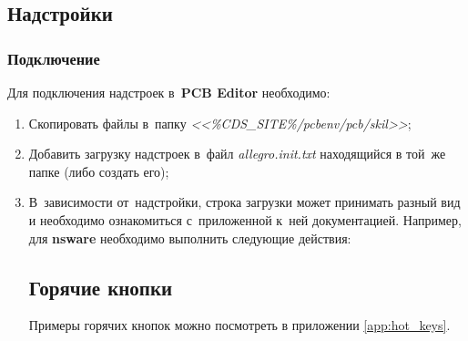 \subsection{Надстройки} \label{ssec:plugin}

\subsubsection{Подключение} \label{sssec:plugin_setup}

Для подключения надстроек в~\textbf{PCB Editor} необходимо:
\begin{enumerate}
	\item Скопировать файлы в~папку \textit{<<\%CDS\_SITE\%/pcbenv/pcb/skil>>};
	\item Добавить загрузку надстроек в~файл \textit{allegro.init.txt} находящийся в той~же папке (либо создать его);
	\item В~зависимости от~надстройки, строка загрузки может принимать разный вид и необходимо ознакомиться с~приложенной к~ней документацией. Например, для \textbf{nsware} необходимо выполнить следующие действия:
	\begin{figure}[H]
	\end{figure}
	 
\subsection{Горячие кнопки} \label{ssec:hot_keys}
	 
	 Примеры горячих кнопок можно посмотреть в приложении \ref{app:hot_keys}.
	 
\end{enumerate}